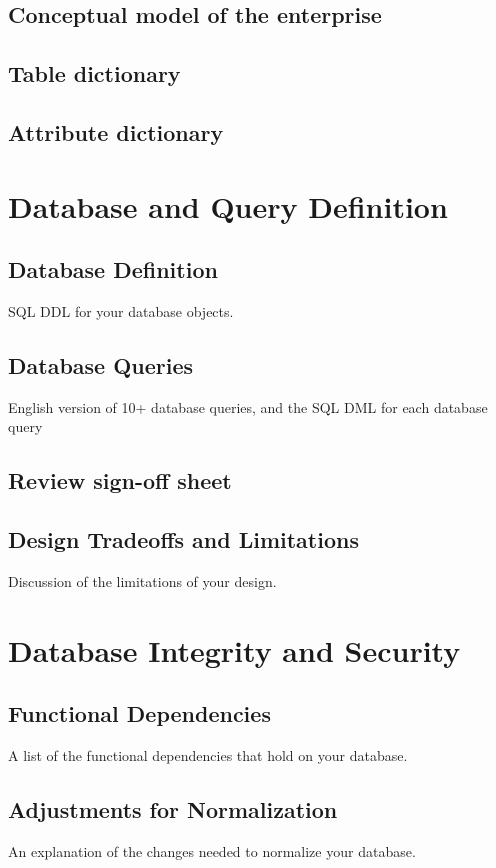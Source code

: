 \documentclass[11pt, a4paper]{report}
\begin{document}
\section{Conceptual model of the enterprise}
\section{Table dictionary}
\section{Attribute dictionary}

\chapter{Database and Query Definition}

\section{Database Definition}
    SQL DDL for your database objects.
\section{Database Queries}
    English version of 10+ database queries, and the SQL DML for each database query
\section{Review sign-off sheet}
\section{Design Tradeoffs and Limitations}
    Discussion of the limitations of your design.

\chapter{Database Integrity and Security}
\section{Functional Dependencies}
    A list of the functional dependencies that hold on your database.
\section{Adjustments for Normalization}
    An explanation of the changes needed to normalize your database.
\end{document}
